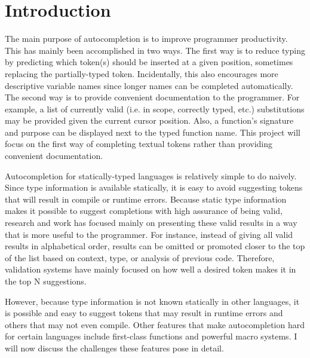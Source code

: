 \documentclass[ms,electronic,twosidetoc,letterpaper,chaptercenter,parttop,lol,lof,lot]{byumsphd}
\title{\Title}
\author{\Author}
\begin{document}
\maketitle
{}

\chapter{Introduction}

The main purpose of autocompletion is to improve programmer productivity. This has mainly been accomplished in two ways. The first way is to reduce typing by predicting which token(s) should be inserted at a given position, sometimes replacing the partially-typed token. Incidentally, this also encourages more descriptive variable names since longer names can be completed automatically. The second way is to provide convenient documentation to the programmer. For example, a list of currently valid (i.e. in scope, correctly typed, etc.) substitutions may be provided given the current cursor position. Also, a function's signature and purpose can be displayed next to the typed function name. This project will focus on the first way of completing textual tokens rather than providing convenient documentation.

Autocompletion for statically-typed languages is relatively simple to do naively. Since type information is available statically, it is easy to avoid suggesting tokens that will result in compile or runtime errors. Because static type information makes it possible to suggest completions with high assurance of being valid, research and work has focused mainly on presenting these valid results in a way that is more useful to the programmer. For instance, instead of giving all valid results in alphabetical order, results can be omitted or promoted closer to the top of the list based on context, type, or analysis of previous code. Therefore, validation systems have mainly focused on how well a desired token makes it in the top N suggestions.

However, because type information is not known statically in other languages, it is possible and easy to suggest tokens that may result in runtime errors and others that may not even compile. Other features that make autocompletion hard for certain languages include first-class functions and powerful macro systems. I will now discuss the challenges these features pose in detail.

\end{document}
